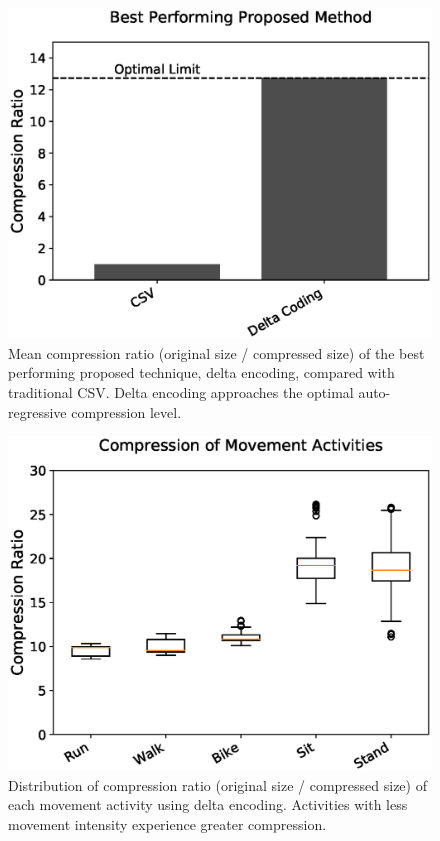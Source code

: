 \documentclass[journal]{IEEEtran}
\begin{document}
\begin{figure}

  \includegraphics[width=\linewidth]{diff.eps}
  \caption{Mean compression ratio (original size / compressed size) of the best performing proposed technique, delta encoding, compared with traditional CSV. Delta encoding approaches the optimal auto-regressive compression level.}
  \label{fig:main_results}
  
\end{figure}
\begin{figure}

  \includegraphics[width=\linewidth]{movement.eps}
  \caption{Distribution of compression ratio (original size / compressed size) of each movement activity using delta encoding. Activities with less movement intensity experience greater compression.}
  \label{fig:movements}
  
\end{figure}
\end{document}
